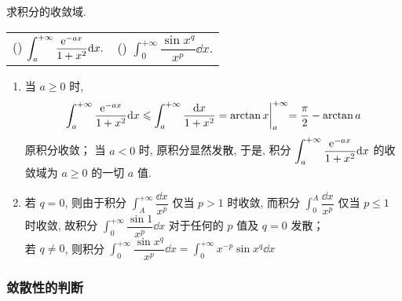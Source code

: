 \begin{example}
    求积分的收敛域.
    \setcounter{magicrownumbers}{0}
    \begin{table}[H]
        \centering
        \begin{tabular}{l | l}
            (\rownumber{}) $\displaystyle\int_{a}^{+\infty}\dfrac{\mathrm{e} ^{-ax}}{1+x^2}\dd x.$ & (\rownumber{}) $\displaystyle\int_{0}^{+\infty}\dfrac{\sin x^q}{x^p}\dd x.$
        \end{tabular}
    \end{table}
\end{example}
\begin{solution}
    \begin{enumerate}[label=(\arabic{*})]
        \item 当 $a\geqslant 0$ 时, $$\displaystyle \int_{a}^{+\infty}\dfrac{\mathrm{e} ^{-ax}}{1+x^2}\dd x\leqslant \int_{a}^{+\infty}\dfrac{\dd x}{1+x^2}=\arctan x\biggl |_a^{+\infty}=\dfrac{\pi}{2}-\arctan a$$ 原积分收敛；
              当 $a<0$ 时, 原积分显然发散, 于是, 积分 $\displaystyle\int_{a}^{+\infty}\dfrac{\mathrm{e} ^{-ax}}{1+x^2}\dd x$ 的收敛域为 $a\geqslant 0$ 的一切 $a$ 值.
        \item 若 $q=0$, 则由于积分 $\displaystyle\int_{A}^{+\infty}\dfrac{\dd x}{x^p}$ 仅当 $p>1$ 时收敛, 而积分 $\displaystyle\int_{0}^{A}\dfrac{\dd x}{x^p}$ 仅当 $p\leqslant1$ 时收敛, 故积分
              $\displaystyle\int_{0}^{+\infty}\dfrac{\sin 1}{x^p}\dd x$ 对于任何的 $p$ 值及 $q=0$ 发散；\\
              若 $q\neq 0$, 则积分 $\displaystyle\int_{0}^{+\infty}\dfrac{\sin x^q}{x^p}\dd x=\int_{0}^{+\infty}x^{-p}\sin x^q\dd x$
    \end{enumerate}
\end{solution}

\subsubsection{敛散性的判断}


